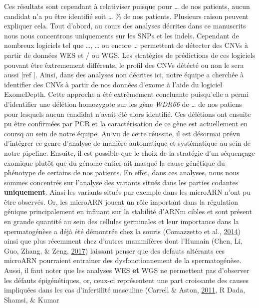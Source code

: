 \documentclass[12pt,twoside]{reedthesis}
\theoremstyle{definition}
\theoremstyle{definition}
\theoremstyle{remark}
\begin{document}
  Ces résultats sont cependant à relativiser puisque pour \ldots{} de nos
  patients, aucun candidat n'a pu être identifié soit \ldots{} \% de nos
  patients. Plusieurs raison peuvent expliquer cela. Tout d'abord, au
  cours des analyses décrites dans ce manuscrits nous nous concentrons
  uniquements sur les SNPs et les indels. Cependant de nombreux logiciels
  tel que \ldots{}, \ldots{} ou encore \ldots{} permettent de détecter des
  CNVs à partir de données WES et / ou WGS. Les stratégies de prédictions
  de ces logiciels pouvant être êxtremement différents, le profil des CNVs
  détécté ou non le sera aussi {[}ref {]}. Ainsi, dans des analyses non
  décrites ici, notre équipe a cherchée à identifier des CNVs à partir de
  nos données d'exome à l'aide du logiciel ExomeDepth. Cette approche a
  été extrêmement concluante puisqu'elle a permi d'identifier une délétion
  homozygote sur les gène \emph{WDR66} de \ldots{} de nos patiens pour
  lesquels aucun candidat n'avait été alors identifié. Ces délétions ont
  ensuite pu être confirmées par PCR et la caractérisation de ce gène est
  actuellement en coursq au sein de notre équipe. Au vu de cette réussite,
  il est désormai prévu d'intégrer ce genre d'analyse de manière
  automatique et systématique au sein de notre pipeline. Ensuite, il est
  possible que le choix de la stratégie d'un séquençage exomique plutôt
  que du génome entier ait masqué la cause génétique du phénotype de
  certains de nos patients. En effet, dans ces analyses, nous nous sommes
  concentrés sur l'analyse des variants situés dans les parties codantes
  \textbf{uniquement}. Ainsi les variants situés par exemple dans les
  microARN n'ont pu être observés. Or, les microARN jouent un rôle
  important dans la régulation génique principalement en influant sur la
  stabilité d'ARNm cibles et sont présent en grande quantité au sein des
  cellules germinales et leur importance dans la spermatogénèse a déjà été
  démontrée chez la souris (Comazzetto et al.,
  \protect\hyperlink{ref-Comazzetto2014}{2014}) ainsi que plus récemment
  chez d'autres mammifères dont l'Humain (Chen, Li, Guo, Zhang, \& Zeng,
  \protect\hyperlink{ref-Chen2017}{2017}) laissant penser que des defauts
  altérants ces microARN pourraient entrainer des dysfonctionnement de la
  spermatogénèse. Aussi, il faut noter que les analyses WES \textbf{et}
  WGS ne permettent pas d'observer les défauts épigénétiques, or, ceux-ci
  représentent une part croissante des causes impliquées dans les cas
  d'infertilité masculine (Carrell \& Aston,
  \protect\hyperlink{ref-Carrell2011}{2011}, R Dada, Shamsi, \& Kumar
\end{document}
